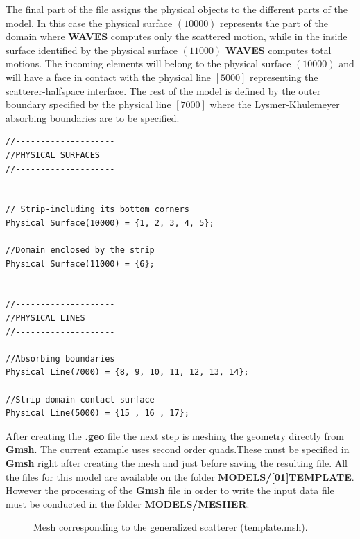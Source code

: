\documentclass[12pt,letterpaper]{article}
\begin{document}
The final part of the file assigns the physical objects to the different parts of the model. In this case the physical surface $(10000)$ represents the part of the domain where {\bf WAVES} computes only the scattered motion, while in the inside surface identified by the physical surface $(11000)$ {\bf WAVES} computes total motions. The incoming elements will belong to the physical surface $(10000)$  and will have a face in contact with the physical line $[5000]$ representing the scatterer-halfspace interface. The rest of the model is defined by the outer boundary specified by the physical line $[7000]$ where the Lysmer-Khulemeyer absorbing boundaries are to be specified.

\begin{verbatim}
//--------------------
//PHYSICAL SURFACES
//--------------------


// Strip-including its bottom corners
Physical Surface(10000) = {1, 2, 3, 4, 5};

//Domain enclosed by the strip
Physical Surface(11000) = {6};


//--------------------
//PHYSICAL LINES
//--------------------

//Absorbing boundaries
Physical Line(7000) = {8, 9, 10, 11, 12, 13, 14};

//Strip-domain contact surface
Physical Line(5000) = {15 , 16 , 17};
\end{verbatim}

After creating the {\bf .geo} file the next step is meshing the geometry directly from {\bf Gmsh}. The current example uses second order quads.These must be specified in {\bf Gmsh} right after creating the mesh and just before saving the resulting file. All the files for this model are available on the folder {\bf MODELS/[01]TEMPLATE}. However the processing of the {\bf Gmsh} file in order to write the input data file must be conducted in the folder {\bf MODELS/MESHER}. 


\begin{figure}[H]
\centering
{}
\caption{Mesh corresponding to the generalized scatterer (template.msh).}
\label{fig:malla}
\end{figure}
\end{document}
